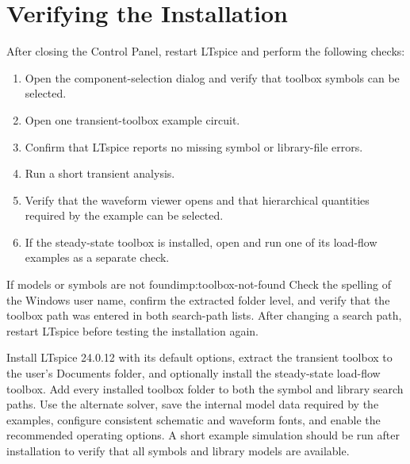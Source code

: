 \section{Verifying the Installation}
\label{sec:verify-LTspice-toolboxes}

After closing the Control Panel, restart LTspice and perform the following
checks:

\begin{enumerate}
\item Open the component-selection dialog and verify that toolbox symbols can
      be selected.
\item Open one transient-toolbox example circuit.
\item Confirm that LTspice reports no missing symbol or library-file errors.
\item Run a short transient analysis.
\item Verify that the waveform viewer opens and that hierarchical quantities
      required by the example can be selected.
\item If the steady-state toolbox is installed, open and run one of its
      load-flow examples as a separate check.
\end{enumerate}

\begin{important}{If models or symbols are not found}{imp:toolbox-not-found}
Check the spelling of the Windows user name, confirm the extracted folder
level, and verify that the toolbox path was entered in both search-path lists.
After changing a search path, restart LTspice before testing the installation
again.
\end{important}

\begin{chaptersummary}
Install LTspice 24.0.12 with its default options, extract the transient toolbox
to the user's Documents folder, and optionally install the steady-state
load-flow toolbox. Add every installed toolbox folder to both the symbol and
library search paths. Use the alternate solver, save the internal model data
required by the examples, configure consistent schematic and waveform fonts,
and enable the recommended operating options. A short example simulation
should be run after installation to verify that all symbols and library models
are available.
\end{chaptersummary}
